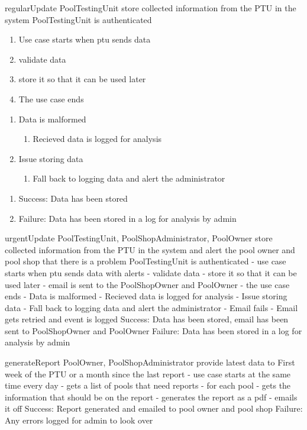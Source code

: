 \usecase
{regularUpdate}
{PoolTestingUnit}
{store collected information from the PTU in the system}
{PoolTestingUnit is authenticated}
{
\begin{enumerate}
\item Use case starts when ptu sends data
\item validate data
\item store it so that it can be used later
\item The use case ends
\end{enumerate}
}
{
\begin{enumerate}
\item Data is malformed
\begin{enumerate}
\item Recieved data is logged for analysis
\end{enumerate}
\item Issue storing data
\begin{enumerate}
\item Fall back to logging data and alert the administrator
\end{enumerate}
\end{enumerate}
}
{\begin{enumerate}
\item Success: Data has been stored
\item Failure: Data has been stored in a log for analysis by admin
\end{enumerate}}

\usecase
{urgentUpdate}
{PoolTestingUnit, PoolShopAdministrator, PoolOwner}
{store collected information from the PTU in the system and alert the pool owner and pool shop that there is a problem}
{PoolTestingUnit is authenticated}
{  - use case starts when ptu sends data with alerts
  - validate data
  - store it so that it can be used later
  - email is sent to the PoolShopOwner and PoolOwner
  - the use case ends}
{  - Data is malformed
    - Recieved data is logged for analysis
  - Issue storing data
    - Fall back to logging data and alert the administrator
  - Email fails
    - Email gets retried and event is logged}
{  Success: Data has been stored, email has been sent to PoolShopOwner and PoolOwner
  Failure: Data has been stored in a log for analysis by admin}

\usecase
{generateReport}
{PoolOwner, PoolShopAdministrator}
{provide latest data to }
{First week of the PTU or a month since the last report}
{  - use case starts at the same time every day
  - gets a list of pools that need reports
  - for each pool
    - gets the information that should be on the report
    - generates the report as a pdf
    - emails it off}
{}
{  Success: Report generated and emailed to pool owner and pool shop
  Failure: Any errors logged for admin to look over}


